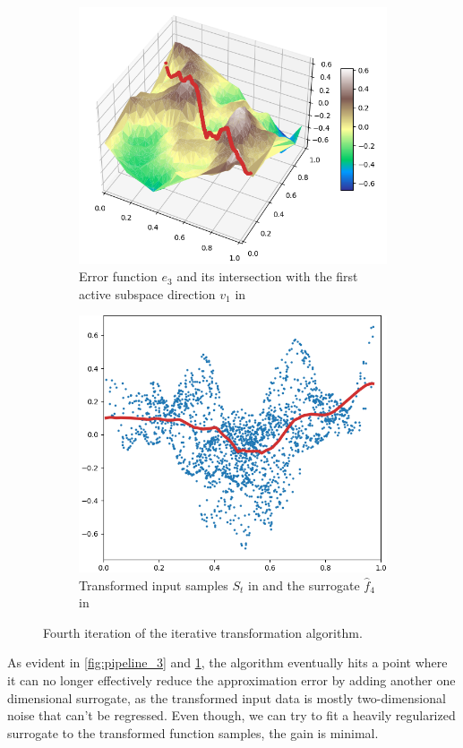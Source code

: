 \documentclass[
  a4paper,  %
  twoside,  %
  bibliography=totoc,
  headsepline,
  cleardoublepage=empty,
  parskip=half,
  draft=false
]{scrbook}
\begin{document}
\begin{mdframed}[style=style]
\begin{figure}[H]
\begin{subfigure}{.5\textwidth}
  \centering
  \includegraphics[width=.85\linewidth]{graphics/pipeline_current_4.png}
  \caption{Error function $e_3$ and its intersection with the first active subspace direction $v_1$ in \reddot}
\end{subfigure}%
\begin{subfigure}{.5\textwidth}
  \centering
  \includegraphics[width=.85\linewidth]{graphics/pipeline_local_4.png}
  \caption{Transformed input samples $S_t$ in \darkblue and the surrogate $\hat{f}_4$ in \reddot}
\end{subfigure}
\delimit
\caption{Fourth iteration of the iterative transformation algorithm.}
\label{fig:pipeline_4}
\end{figure}
\end{mdframed}
%
As evident in \cref{fig:pipeline_3} and \cref{fig:pipeline_4}, the algorithm eventually hits a point where it can no longer effectively reduce the approximation error by adding another one dimensional surrogate, as the transformed input data is mostly two-dimensional noise that can't be regressed.
Even though, we can try to fit a heavily regularized surrogate to the transformed function samples, the gain is minimal.
\end{document}
